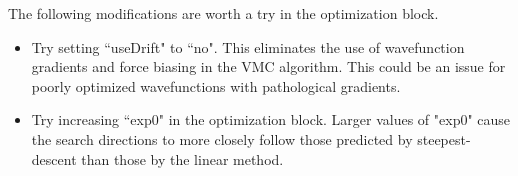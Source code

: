The following modifications are worth a try in the optimization block.

\begin{itemize}
\item Try setting ``useDrift" to ``no".  This eliminates the use of wavefunction gradients and force biasing in the VMC algorithm.  This could be an issue for poorly optimized wavefunctions with pathological gradients.  
\item Try increasing ``exp0" in the optimization block.  Larger values of "exp0" cause the search directions to more closely follow those predicted by steepest-descent than those by the linear method.
\end{itemize}


